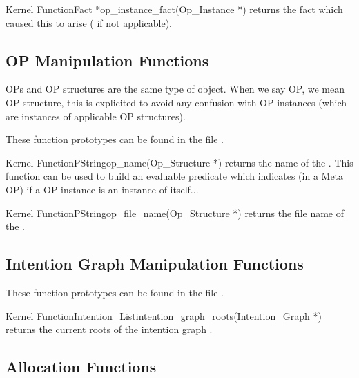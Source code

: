 \begin{typefn}{Kernel Function}{Fact *}{op\_instance\_fact}{(Op\_Instance
*)}
returns the fact which caused this  to arise
( if not applicable).
\end{typefn}

\subsection{OP Manipulation Functions}

OPs and OP structures are the same type of object. When we say OP, we mean
OP structure, this is explicited to avoid any confusion with OP
instances (which are instances of applicable OP structures).

These function prototypes can be found in the file
.

\begin{typefn}{Kernel Function}{PString}{op\_name}{(Op\_Structure *)}
returns the name of the . This function can be used to build an
evaluable predicate which indicates (in a Meta OP) if a OP instance is an
instance of itself...
\end{typefn}

\begin{typefn}{Kernel Function}{PString}{op\_file\_name}{(Op\_Structure
*)}
returns the file name of the .
\end{typefn}

\subsection{Intention Graph Manipulation Functions}

These function prototypes can be found in the file
.

\begin{typefn}{Kernel Function}{Intention\_List}{intention\_graph\_roots}{(Intention\_Graph
*)}
returns the current roots of the intention graph .
\end{typefn}

\subsection{Allocation Functions}

